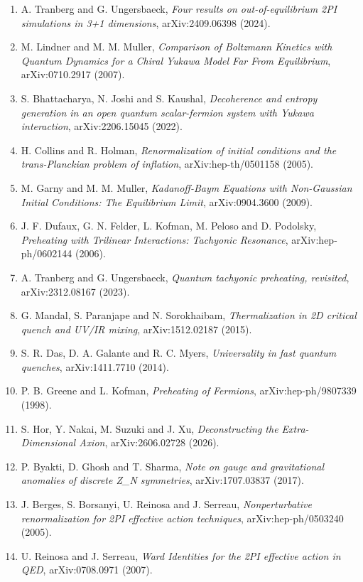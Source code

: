 \documentclass[
  10pt,
]{article}
\providecommand{\tightlist}{%
  \setlength{\itemsep}{0pt}\setlength{\parskip}{0pt}}
\begin{document}
\begin{enumerate}
\def\labelenumi{\arabic{enumi}.}
\tightlist
\item
  A. Tranberg and G. Ungersbaeck, \emph{Four results on
  out-of-equilibrium 2PI simulations in 3+1 dimensions},
  arXiv:2409.06398 (2024).
\item
  M. Lindner and M. M. Muller, \emph{Comparison of Boltzmann Kinetics
  with Quantum Dynamics for a Chiral Yukawa Model Far From Equilibrium},
  arXiv:0710.2917 (2007).
\item
  S. Bhattacharya, N. Joshi and S. Kaushal, \emph{Decoherence and
  entropy generation in an open quantum scalar-fermion system with
  Yukawa interaction}, arXiv:2206.15045 (2022).
\item
  H. Collins and R. Holman, \emph{Renormalization of initial conditions
  and the trans-Planckian problem of inflation}, arXiv:hep-th/0501158
  (2005).
\item
  M. Garny and M. M. Muller, \emph{Kadanoff-Baym Equations with
  Non-Gaussian Initial Conditions: The Equilibrium Limit},
  arXiv:0904.3600 (2009).
\item
  J. F. Dufaux, G. N. Felder, L. Kofman, M. Peloso and D. Podolsky,
  \emph{Preheating with Trilinear Interactions: Tachyonic Resonance},
  arXiv:hep-ph/0602144 (2006).
\item
  A. Tranberg and G. Ungersbaeck, \emph{Quantum tachyonic preheating,
  revisited}, arXiv:2312.08167 (2023).
\item
  G. Mandal, S. Paranjape and N. Sorokhaibam, \emph{Thermalization in 2D
  critical quench and UV/IR mixing}, arXiv:1512.02187 (2015).
\item
  S. R. Das, D. A. Galante and R. C. Myers, \emph{Universality in fast
  quantum quenches}, arXiv:1411.7710 (2014).
\item
  P. B. Greene and L. Kofman, \emph{Preheating of Fermions},
  arXiv:hep-ph/9807339 (1998).
\item
  S. Hor, Y. Nakai, M. Suzuki and J. Xu, \emph{Deconstructing the
  Extra-Dimensional Axion}, arXiv:2606.02728 (2026).
\item
  P. Byakti, D. Ghosh and T. Sharma, \emph{Note on gauge and
  gravitational anomalies of discrete Z\_N symmetries}, arXiv:1707.03837
  (2017).
\item
  J. Berges, S. Borsanyi, U. Reinosa and J. Serreau,
  \emph{Nonperturbative renormalization for 2PI effective action
  techniques}, arXiv:hep-ph/0503240 (2005).
\item
  U. Reinosa and J. Serreau, \emph{Ward Identities for the 2PI effective
  action in QED}, arXiv:0708.0971 (2007).
\end{enumerate}
\end{document}
